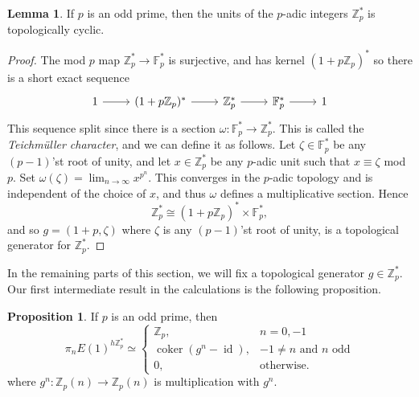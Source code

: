 \documentclass[a4paper]{article} %
\theoremstyle{definition}
\newtheorem{lemma}[theorem]{Lemma}
\newtheorem{proposition}[theorem]{Proposition}
\newcommand{\Z}{\mathbb{Z}}
\newcommand{\F}{\mathbb{F}}
\DeclareMathOperator{\id}{id}           %
\DeclareMathOperator{\coker}{coker}     %
\begin{document}
\begin{lemma}
  If $p$ is an odd prime, then the units of the $p$-adic integers $\Z_p^*$ is topologically cyclic.
\end{lemma}
\begin{proof}
The mod $p$ map $\Z_p^* \to \F_p^*$ is surjective, and has kernel $(1+p\Z_p)^*$ so there is a short exact sequence
\[
\begin{tikzcd}
1 \rar & (1+p\Z_p)^* \rar{} & \Z_p^* \rar{} & \F_p^* \rar & 1
\end{tikzcd}
\]
This sequence split since there is a section $\omega \colon \F_p^* \to \Z_p^*$. This is called the \textit{Teichmüller character}, and we can define it as follows. Let $\zeta \in \F_p^*$ be any $(p-1)$'st root of unity, and let $x \in \Z_p^*$ be any $p$-adic unit such that $x \equiv \zeta$ mod $p$. Set $\omega(\zeta) = \lim_{n \to \infty} x^{p^n}$. This converges in the $p$-adic topology and is independent of the choice of $x$,
and thus $\omega$ defines a multiplicative section. Hence
\[
\Z_p^* \cong (1 + p\Z_p)^* \times \F_p^*,
\]
and so $g = (1+p, \zeta)$ where $\zeta$ is any $(p-1)$'st root of unity, is a topological generator for $\Z_p^*$.
\end{proof}
In the remaining parts of this section, we will fix a topological generator $g \in \Z_p^*$. Our first intermediate result in the calculations is the following proposition.
\begin{proposition}
  If $p$ is an odd prime, then
  \[
   \pi_n E(1)^{h\Z_p^*} \simeq
     \begin{cases}
     \Z_p, & n=0,-1 \\
     \coker (g^n - \id), & -1 \neq n \text{ and $n$ odd} \\
     0, & \text{otherwise.}
     \end{cases}
   \]
   where  $g^n \colon \Z_p(n) \to \Z_p(n)$ is multiplication with $g^n$.
\end{proposition}
\end{document}
